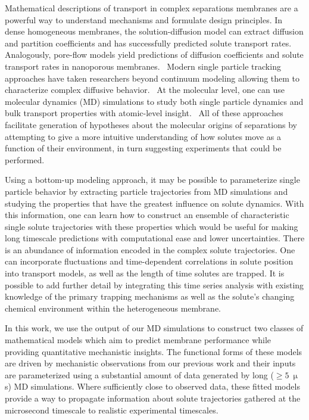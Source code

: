 \documentclass[journal=jctcce,manuscript=article]{achemso}
\begin{document}
  Mathematical descriptions of transport in complex separations membranes are a
  powerful way to understand mechanisms and formulate design principles.
  \cite{vinh-thang_predictive_2013,geens_transport_2006,darvishmanesh_mass_2016}
  In dense homogeneous membranes, the solution-diffusion model
  can extract diffusion and partition coefficients and has successfully
  predicted solute transport rates.~\cite{wijmans_solution-diffusion_1995}
  Analogously, pore-flow models yield predictions of diffusion coefficients and
  solute transport rates in nanoporous membranes.~\cite{paul_diffusive_1974}
  Modern single particle tracking approaches have taken researchers beyond
  continuum modeling allowing them to characterize complex diffusive
  behavior.~\cite{manzo_review_2015} At the molecular level, one can use
  molecular dynamics (MD) simulations to study both single particle dynamics
  and bulk transport properties with atomic-level
  insight.~\cite{coscia_chemically_2019,maginn_best_2018} All of these
  approaches facilitate generation of hypotheses about the molecular origins of
  separations by attempting to give a more intuitive understanding of how
  solutes move as a function of their environment, in turn suggesting
  experiments that could be performed.

  Using a bottom-up modeling approach, it may be possible to parameterize single
  particle behavior by extracting particle trajectories from MD simulations and
  studying the properties that have the greatest influence on solute dynamics.
  With this information, one can learn how to construct an ensemble of characteristic
  single solute trajectories with these properties which would be useful for
  making long timescale predictions with computational ease and lower
  uncertainties. There is an abundance of information encoded in
  the complex solute trajectories. One can incorporate fluctuations and 
  time-dependent correlations in solute position into transport models, 
  as well as the length of time solutes are trapped. It is possible to add further
  detail by integrating this time series analysis with existing knowledge of the
  primary trapping mechanisms as well as the solute's changing chemical environment
  within the heterogeneous membrane. 

  In this work, we use the output of our MD simulations to construct two
  classes of mathematical models which aim to predict membrane performance
  while providing quantitative mechanistic insights. The functional forms of
  these models are driven by mechanistic observations from our previous work and
  their inputs are parameterized using a substantial amount of data generated
  by long ($\geq 5~\upmu$s) MD simulations. Where sufficiently close to observed data,
  these fitted models provide a way to propagate information about solute 
  trajectories gathered at the microsecond timescale to realistic experimental 
  timescales. 
\end{document}
